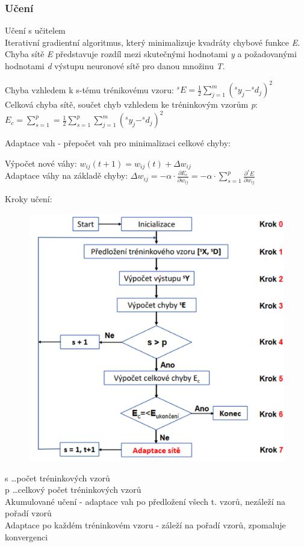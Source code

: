 \subsubsection{Učení}
Učení s učitelem\\
Iterativní gradientní algoritmus, který minimalizuje kvadráty chybové funkce \textit{E}.\\
Chyba sítě \textit{E} představuje rozdíl mezi skutečnými hodnotami \textit{y} a požadovanými hodnotami \textit{d} výstupu neuronové sítě pro danou množinu \textit{T}.\\
\begin{center}
    Chyba vzhledem k s-tému trénikovému vzoru: \(^{s}E = \frac{1}{2}\sum_{j = 1}^{m}(^{s}y_j - ^{s}d_j)^2\)\\
    Celková chyba sítě, součet chyb vzhledem ke tréninkovým vzorům \textit{p}: \(E_c = \sum_{s = 1}^{p} = \frac{1}{2}\sum_{s = 1}^{p}\sum_{j = 1}^{m}(^{s}y_j - ^{s}d_j)^2\)
\end{center}
Adaptace vah - přepočet vah pro minimalizaci celkové chyby:
\begin{center}
    Výpočet nové váhy: \(w_{ij}(t+1) = w_{ij}(t) + \Delta w_{ij}\)\\
    Adaptace váhy na základě chyby: \(\Delta w_{ij} = -\alpha \cdot \frac{\partial E_c}{\partial w_{ij}} = -\alpha \cdot \sum_{s = 1}^{p} \frac{\partial ^{s}E}{\partial w_{ij}}\)
\end{center}
Kroky učení:
\begin{figure}[H]
    \includegraphics[scale = 0.3]{images/backPropag_uceni.png}
\end{figure}
s \dots počet tréninkových vzorů\\
p \dots celkový počet tréninkových vzorů\\
Akumulované učení - adaptace vah po předložení všech t. vzorů, nezáleží na pořadí vzorů\\
Adaptace po každém tréninkovém vzoru - záleží na pořadí vzorů, zpomaluje konvergenci

